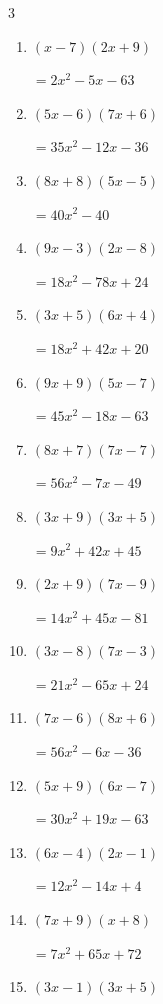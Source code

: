 \begin{multicols}{3}
\begin{enumerate}
        $=32x^{2}+36x-18$

\columnbreak %

  \item $(x-7)(2x+9)$

        $=2x^{2}-5x-63$

  \item $(5x-6)(7x+6)$

        $=35x^{2}-12x-36$

  \item $(8x+8)(5x-5)$

        $=40x^{2}-40$

  \item $(9x-3)(2x-8)$

        $=18x^{2}-78x+24$

  \item $(3x+5)(6x+4)$

        $=18x^{2}+42x+20$

  \item $(9x+9)(5x-7)$

        $=45x^{2}-18x-63$

  \item $(8x+7)(7x-7)$

        $=56x^{2}-7x-49$

  \item $(3x+9)(3x+5)$

        $=9x^{2}+42x+45$

  \item $(2x+9)(7x-9)$

        $=14x^{2}+45x-81$

  \item $(3x-8)(7x-3)$

        $=21x^{2}-65x+24$

  \item $(7x-6)(8x+6)$

        $=56x^{2}-6x-36$

  \item $(5x+9)(6x-7)$

        $=30x^{2}+19x-63$

  \item $(6x-4)(2x-1)$

        $=12x^{2}-14x+4$

  \item $(7x+9)(x+8)$

        $=7x^{2}+65x+72$

  \item $(3x-1)(3x+5)$


\end{enumerate}
\end{multicols}
